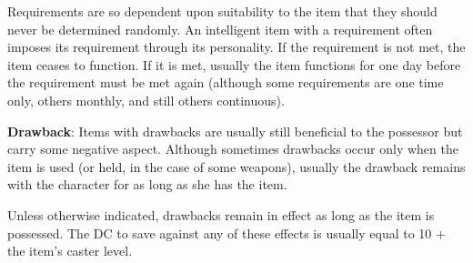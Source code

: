 Requirements are so dependent upon suitability to the item that they should never be determined randomly. An intelligent item with a requirement often imposes its requirement through its personality. If the requirement is not met, the item ceases to function. If it is met, usually the item functions for one day before the requirement must be met again (although some requirements are one time only, others monthly, and still others continuous).
				
\textbf{Drawback}: Items with drawbacks are usually still beneficial to the possessor but carry some negative aspect. Although sometimes drawbacks occur only when the item is used (or held, in the case of some weapons), usually the drawback remains with the character for as long as she has the item.
				
Unless otherwise indicated, drawbacks remain in effect as long as the item is possessed. The DC to save against any of these effects is usually equal to 10 + the item's caster level.

